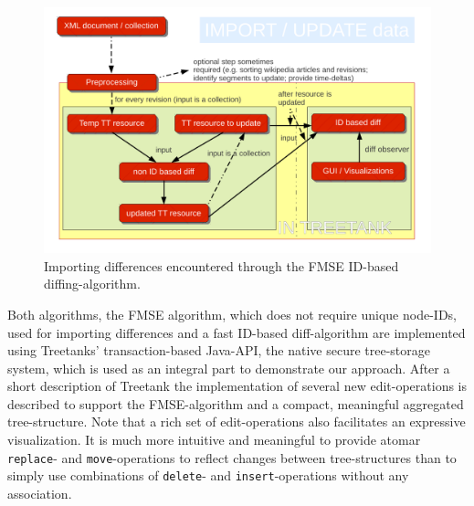 \begin{figure}[tb]
\centering
\includegraphics[width=\textwidth]{figures/importdata}
\caption{Importing differences encountered through the FMSE ID-based diffing-algorithm.} 
\label{fig:importdata}
\end{figure}

Both algorithms, the FMSE algorithm, which does not require unique node-IDs, used for importing differences and a fast ID-based diff-algorithm are implemented using Treetanks' transaction-based Java-API, the native secure tree-storage system, which is used as an integral part to demonstrate our approach. After a short description of Treetank the implementation of several new edit-operations is described to support the FMSE-algorithm and a compact, meaningful aggregated tree-structure. Note that a rich set of edit-operations also facilitates an expressive visualization. It is much more intuitive and meaningful to provide atomar \texttt{replace}- and \texttt{move}-operations to reflect changes between tree-structures than to simply use combinations of \texttt{delete}- and \texttt{insert}-operations without any association. 


